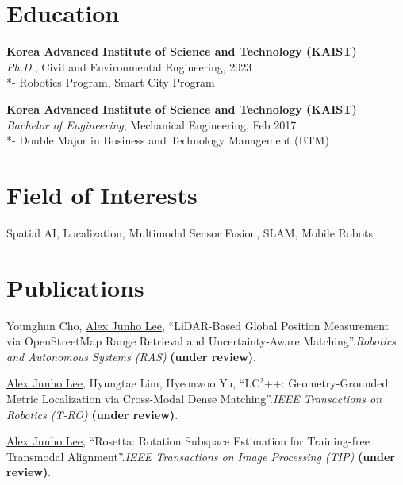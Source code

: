 \documentclass[margin]{res}
\newcommand{\cvbodyfont}{\fontsize{9.5pt}{12pt}\selectfont}
\begin{document}
	\begin{resume}
		\cvbodyfont
		\raggedright
		\setlength{\parskip}{7pt}
		\setlength{\sectionskip}{15pt}
		
		\section{Education}
		\textbf{Korea Advanced Institute of Science and Technology (KAIST)}\\
		{\sl Ph.D.}, Civil and Environmental Engineering, 2023
		\\*- Robotics Program, Smart City Program

		\par \textbf{Korea Advanced Institute of Science and Technology (KAIST)}\\
		{\sl Bachelor of Engineering}, Mechanical Engineering, Feb 2017
		\\*- Double Major in Business and Technology Management (BTM)

		\section{Field of Interests}
		Spatial AI, Localization, Multimodal Sensor Fusion, SLAM, Mobile Robots

		\section{Publications}
		\par Younghun Cho, \underline{Alex Junho Lee}, ``LiDAR-Based Global Position Measurement via OpenStreetMap Range Retrieval and Uncertainty-Aware Matching''.\newline \textit{Robotics and Autonomous Systems (RAS)} \textbf{(under review)}.

		\par \underline{Alex Junho Lee}, Hyungtae Lim, Hyeonwoo Yu, ``LC$^2$++: Geometry-Grounded Metric Localization via Cross-Modal Dense Matching''.\newline \textit{IEEE Transactions on Robotics (T-RO)} \textbf{(under review)}.

		\par \underline{Alex Junho Lee}, ``Rosetta: Rotation Subspace Estimation for Training-free Transmodal Alignment''.\newline \textit{IEEE Transactions on Image Processing (TIP)} \textbf{(under review)}.


\end{resume}
\end{document}
